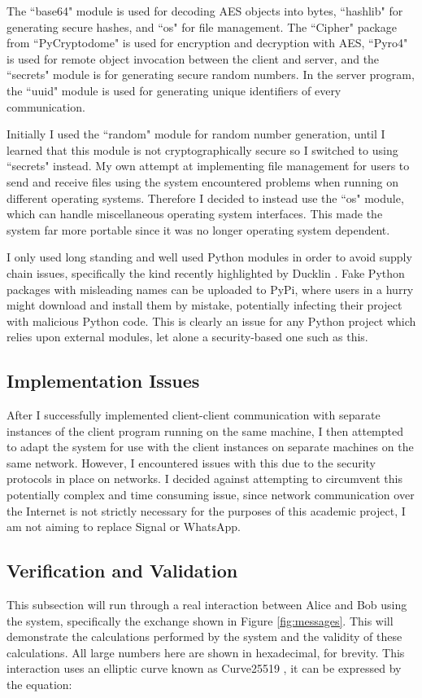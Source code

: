 \documentclass[12pt,a4paper]{article}
\begin{document}
The ``base64" module is used for decoding AES objects into bytes, 
``hashlib" for generating secure hashes, 
and ``os" for file management. 
The ``Cipher" package from ``PyCryptodome" is used for encryption and decryption with AES, 
``Pyro4" is used for remote object invocation between the client and server, 
and the ``secrets" module is for generating secure random numbers. 
In the server program, the ``uuid" module is used for generating unique identifiers of every communication. 

Initially I used the ``random" module for random number generation, 
until I learned that this module is not cryptographically secure so I switched to using ``secrets" instead. 
My own attempt at implementing file management for users to send and receive files 
using the system encountered problems when running on different operating systems. 
Therefore I decided to instead use the ``os" module, which can handle miscellaneous operating system interfaces. 
This made the system far more portable since it was no longer operating system dependent. 

I only used long standing and well used Python modules in order to avoid supply chain issues, 
specifically the kind recently highlighted by Ducklin \citeyear{ducklin2021python}. 
Fake Python packages with misleading names can be uploaded to PyPi, where users in a hurry might download and install them by mistake, 
potentially infecting their project with malicious Python code. 
This is clearly an issue for any Python project which relies upon external modules, let alone a security-based one such as this. 


\subsection{Implementation Issues} \noindent \label{Implementation}
After I successfully implemented client-client communication with separate instances of the client program running on the 
same machine, I then attempted to adapt the system for use with the client instances on separate machines on the same network. 
However, I encountered issues with this due to the security protocols in place on networks. 
I decided against attempting to circumvent this potentially complex and time consuming issue, 
since network communication over the Internet is not strictly necessary for the purposes of this academic project, 
I am not aiming to replace Signal or WhatsApp. 


\subsection{Verification and Validation} \noindent \label{Verification}
This subsection will run through a real interaction between Alice and Bob using the system, 
specifically the exchange shown in Figure \ref{fig:messages}. 
This will demonstrate the calculations performed by the system and the validity of these calculations. 
All large numbers here are shown in hexadecimal, for brevity. 
This interaction uses an elliptic curve known as Curve25519 \cite{10.1007/11745853_14}, 
it can be expressed by the equation: 
\end{document}

